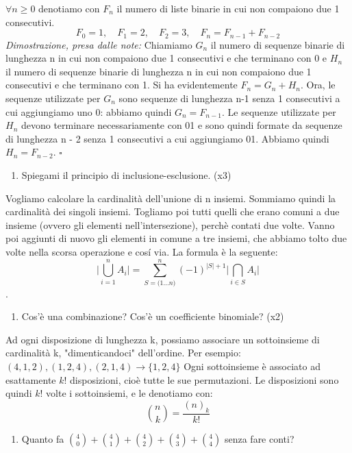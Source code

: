 $\forall n \ge 0 $ denotiamo con $F_n$ il numero di liste binarie in cui non compaiono due 1 consecutivi.\newline
\[F_0 = 1,\quad F_1 = 2 , \quad F_2 = 3, \quad F_n = F_{n-1} + F_{n-2}\]
\textit{Dimostrazione, presa dalle note:}\newline
Chiamiamo $G_n$ il numero di sequenze binarie di lunghezza n in cui non compaiono
due 1 consecutivi e che terminano con 0 e $H_n$ il numero di sequenze binarie di lunghezza n in cui non
compaiono due 1 consecutivi e che terminano con 1. Si ha evidentemente $F_n = G_n + H_n$.
Ora, le sequenze utilizzate per $G_n$ sono sequenze di lunghezza n-1 senza 1 consecutivi a cui aggiungiamo
uno 0: abbiamo quindi $G_n = F_{n-1}$. Le sequenze utilizzate per $H_n$ devono terminare necessariamente con 01
e sono quindi formate da sequenze di lunghezza n - 2 senza 1 consecutivi a cui aggiungiamo 01. Abbiamo
quindi $H_n = F_{n-2}$. $\square$
\begin{enumerate}[resume]\bfseries
\item Spiegami il principio di inclusione-esclusione. (x3)
\end{enumerate}
Vogliamo calcolare la cardinalità dell'unione di n insiemi. Sommiamo quindi la cardinalità dei singoli insiemi. Togliamo poi tutti quelli che erano comuni a due insieme (ovvero gli elementi nell'intersezione), perchè contati due volte. Vanno poi aggiunti di nuovo gli elementi in comune a  tre insiemi, che abbiamo tolto due volte  nella scorsa operazione e cosí via. La formula è la seguente:\newline
 \[\vert\bigcup \limits_{i=1}^{n} A_{i}\vert = \sum_{S = {(1...n})}^{n} (-1)^{\vert S \vert +1} \vert\bigcap\limits_{i\in S} A_{i}\vert\].
 \begin{enumerate}[resume]\bfseries
\item Cos'è una combinazione? Cos'è un coefficiente binomiale? (x2)
\end{enumerate}
Ad ogni disposizione di lunghezza k, possiamo associare un sottoinsieme di cardinalità k, "dimenticandoci" dell'ordine. Per esempio: $(4,1,2),(1,2,4),(2,1,4)  \to \{1,2,4\} $\newline
Ogni sottoinsieme è associato ad esattamente $k!$  disposizioni, cioè tutte le sue permutazioni. Le disposizioni sono quindi $k!$  volte i sottoinsiemi, e le denotiamo con: \[{{n}\choose{k}} = \frac{(n)_k }{k!}\]
 \begin{enumerate}[resume]\bfseries
	\item Quanto fa $\binom{4}{0} + \binom{4}{1} + \binom{4}{2} + \binom{4}{3} + \binom{4}{4}$ senza fare conti?
\end{enumerate}
